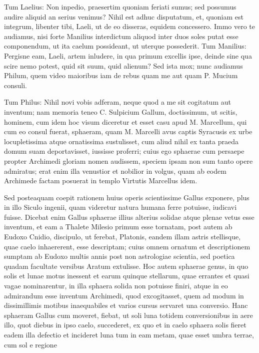  Tum Laelius: Non inpedio, praesertim quoniam feriati sumus; sed possumus audire aliquid an serius venimus? Nihil est adhuc disputatum, et, quoniam est integrum, libenter tibi, Laeli, ut de eo disseras, equidem concessero. Immo vero te audiamus, nisi forte Manilius interdictum aliquod inter duos soles putat esse componendum, ut ita caelum possideant, ut uterque possederit. Tum Manilius: Pergisne eam, Laeli, artem inludere, in qua primum excellis ipse, deinde sine qua scire nemo potest, quid sit suum, quid alienum? Sed ista mox; nunc audiamus Philum, quem video maioribus iam de rebus quam me aut quam P. Mucium consuli.

 Tum Philus: Nihil novi vobis adferam, neque quod a me sit cogitatum aut inventum; nam memoria teneo C. Sulpicium Gallum, doctissimum, ut scitis, hominem, cum idem hoc visum diceretur et esset casu apud M. Marcellum, qui cum eo consul fuerat, sphaeram, quam M. Marcelli avus captis Syracusis ex urbe locupletissima atque ornatissima sustulisset, cum aliud nihil ex tanta praeda domum suam deportavisset, iussisse proferri; cuius ego sphaerae cum persaepe propter Archimedi gloriam nomen audissem, speciem ipsam non sum tanto opere admiratus; erat enim illa venustior et nobilior in volgus, quam ab eodem Archimede factam posuerat in templo Virtutis Marcellus idem.

 Sed posteaquam coepit rationem huius operis scientissime Gallus exponere, plus in illo Siculo ingenii, quam videretur natura humana ferre potuisse, iudicavi fuisse. Dicebat enim Gallus sphaerae illius alterius solidae atque plenae vetus esse inventum, et eam a Thalete Milesio primum esse tornatam, post autem ab Eudoxo Cnidio, discipulo, ut ferebat, Platonis, eandem illam astris stellisque, quae caelo inhaererent, esse descriptam; cuius omnem ornatum et descriptionem sumptam ab Eudoxo multis annis post non astrologiae scientia, sed poetica quadam facultate versibus Aratum extulisse. Hoc autem sphaerae genus, in quo solis et lunae motus inessent et earum quinque stellarum, quae errantes et quasi vagae nominarentur, in illa sphaera solida non potuisse finiri, atque in eo admirandum esse inventum Archimedi, quod excogitasset, quem ad modum in dissimillimis motibus inaequabiles et varios cursus servaret una conversio. Hanc sphaeram Gallus cum moveret, fiebat, ut soli luna totidem conversionibus in aere illo, quot diebus in ipso caelo, succederet, ex quo et in caelo sphaera solis fieret eadem illa defectio et incideret luna tum in eam metam, quae esset umbra terrae, cum sol e regione

